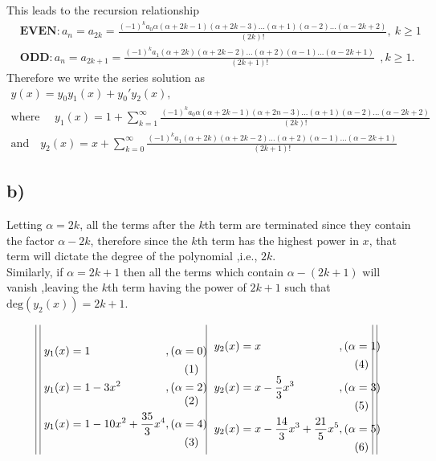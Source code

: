 \documentclass[
	12pt,
	]{article}
\theoremstyle{definition}
\theoremstyle{definition}
\theoremstyle{definition}
\theoremstyle{definition}
\theoremstyle{definition}
\theoremstyle{example}
\theoremstyle{note}
\theoremstyle{remark}
\theoremstyle{example}
\begin{document}
							This leads to the recursion relationship 
									\begin{align*}
													&\textbf{EVEN} : a_{n} = a_{2k} = \frac{(-1)^{k}a_{0}\alpha (\alpha+2k-1)(\alpha+2k-3)\dots(\alpha+1)(\alpha-2)\dots(\alpha-2k+2)}{(2k)!}  , \ k\ge 1\\
													&\textbf{ODD} : a_{n} = a_{2k+1} = \frac{(-1)^{k} a_{1}(\alpha+2k)(\alpha+2k-2)\dots(\alpha+2)(\alpha-1)\dots(\alpha-2k+1)}{(2k+1)!} \ \ ,k \ge 1.
												\end{align*}
					Therefore we write the series solution as
					\begin{gather*}
						y(x) = y_{0} y_1(x) + y_{0}' y_2(x),\\
						\text{where } \quad y_{1}(x) = 1 + \sum_{k=1}^{\infty}\frac{(-1)^{k}a_{0}\alpha (\alpha+2k-1)(\alpha+2n-3)\dots(\alpha+1)(\alpha-2)\dots(\alpha-2k+2)}{(2k)!} \\
						\text{and} \quad y_{2}(x) = x + \sum_{k=0}^{\infty} \frac{(-1)^{k} a_{1}(\alpha+2k)(\alpha+2k-2)\dots(\alpha+2)(\alpha-1)\dots(\alpha-2k+1)}{(2k+1)!}
					\end{gather*}
				\subsection*{b) }
					Letting $\alpha = 2k$, all the terms after the $k$th term are terminated since they contain the factor $\alpha-2k$, therefore since the $k$th term has the highest power in $x$, that term will dictate the degree of the polynomial ,i.e., $2k$.\\ 
					
					\noindent Similarly, if $\alpha =2k+1$ then all the terms which contain $\alpha-(2k+1)$ will vanish ,leaving the $k$th term having the power of $2k+1$ such that $\text{deg}(y_{2}(x)) = 2k+1$.
					
					\begin{equation*}
						\vrule \ \vrule \ \begin{minipage}{0.4\linewidth}
							\begin{alignat*}{2}
								y_{1}(x) &= 1 &&,(\alpha=0)\\
								y_{1}(x) &= 1-3x^{2} &&,(\alpha=2)\\
								y_{1}(x) &= 1-10x^{2}+\frac{35}{3}x^{4} && ,(\alpha=4) 
							\end{alignat*}
						\end{minipage}
						\ \ \vrule \ \
						\begin{minipage}{0.4\linewidth}
							\begin{alignat*}{2}
								y_{2}(x) &= x &&, (\alpha=1)\\
								y_{2}(x) &= x-\frac53 x^{3} && ,(\alpha=3)\\
								y_{2}(x) &= x-\frac{14}{3}x^{3} + \frac{21}{5}x^{5} && ,(\alpha=5) 
							\end{alignat*}							
						\end{minipage}
						\ 	\vrule \ \vrule \
					\end{equation*} 
\end{document}

